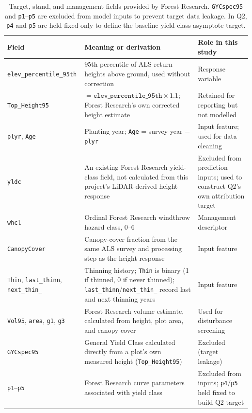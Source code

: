 \begin{table}[!htbp]
\scriptsize
\setlength{\tabcolsep}{3pt}
\renewcommand{\arraystretch}{0.95}
\begin{tabular}{
    >{\raggedright\arraybackslash}p{2.6cm}
    >{\raggedright\arraybackslash}p{7.0cm}
    >{\raggedright\arraybackslash}p{3.2cm}
}
\hline
Field & Meaning or derivation & Role in this study \\
\hline
\texttt{elev\_\allowbreak percentile\_\allowbreak 95th} & 95th percentile of ALS return heights above ground, used without correction & Response variable \\
\texttt{Top\_Height95} & $=\texttt{elev\_percentile\_95th}\times1.1$; Forest Research's own corrected height estimate & Retained for reporting but not modelled \\
\texttt{plyr}, \texttt{Age} & Planting year; \texttt{Age} = survey year $-$ \texttt{plyr} & Input feature; used for data cleaning \\
\texttt{yldc} & An existing Forest Research yield-class field, not calculated from this project's LiDAR-derived height response & Excluded from prediction inputs; used to construct Q2's own attribution target \\
\texttt{whcl} & Ordinal Forest Research windthrow hazard class, 0--6 & Management descriptor \\
\texttt{CanopyCover} & Canopy-cover fraction from the same ALS survey and processing step as the height response & Input feature \\
\texttt{Thin}, \texttt{last\_thinn}, \texttt{next\_thin\_} & Thinning history; \texttt{Thin} is binary (1 if thinned, 0 if never thinned); \texttt{last\_thinn}/\texttt{next\_thin\_} record last and next thinning years & Input feature \\
\texttt{Vol95}, \texttt{area}, \texttt{g1}, \texttt{g3} & Forest Research volume estimate, calculated from height, plot area, and canopy cover & Used for disturbance screening \\
\texttt{GYCspec95} & General Yield Class calculated directly from a plot's own measured height (\texttt{Top\_Height95}) & Excluded (target leakage) \\
\texttt{p1}--\texttt{p5} & Forest Research curve parameters associated with yield class & Excluded from inputs; \texttt{p4}/\texttt{p5} held fixed to build Q2 target \\
\hline
\end{tabular}
\caption{\small{Target, stand, and management fields provided by Forest Research. \texttt{GYCspec95} and \texttt{p1}--\texttt{p5} are excluded from model inputs to prevent target data leakage. In Q2, \texttt{p4} and \texttt{p5} are held fixed only to define the baseline yield-class asymptote target.}}
\label{tab:data-fields}
\end{table}



